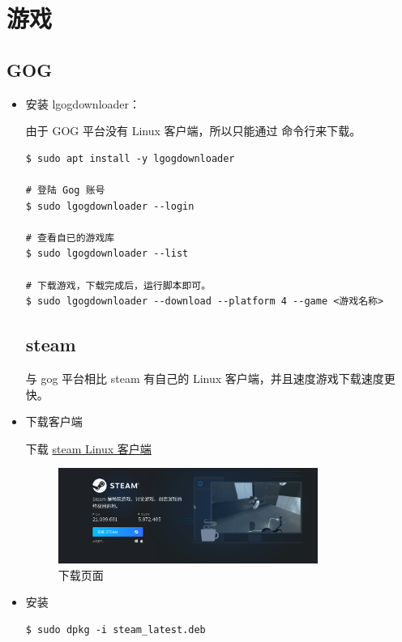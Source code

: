 \chapter{游戏}

\section{GOG}
\begin{itemize}
\item 安装 lgogdownloader：

由于 GOG 平台没有 Linux 客户端，所以只能通过 命令行来下载。

\begin{lstlisting}
$ sudo apt install -y lgogdownloader

# 登陆 Gog 账号
$ sudo lgogdownloader --login 

# 查看自已的游戏库
$ sudo lgogdownloader --list

# 下载游戏，下载完成后，运行脚本即可。
$ sudo lgogdownloader --download --platform 4 --game <游戏名称>
\end{lstlisting}
\newpage

\section{steam}

与 gog 平台相比 steam 有自己的 Linux 客户端，并且速度游戏下载速度更快。

\item 下载客户端

下载 \href{https://store.steampowered.com/about/}{steam Linux 客户端} 

\begin{figure}[htp]  
	\centering
	\includegraphics[width=0.8\textwidth]{./img/game/steam.png}
	\caption{下载页面} %
	\label{fig:steam} %
\end{figure}

\item 安装
\begin{lstlisting}
$ sudo dpkg -i steam_latest.deb
\end{lstlisting}

\end{itemize}

